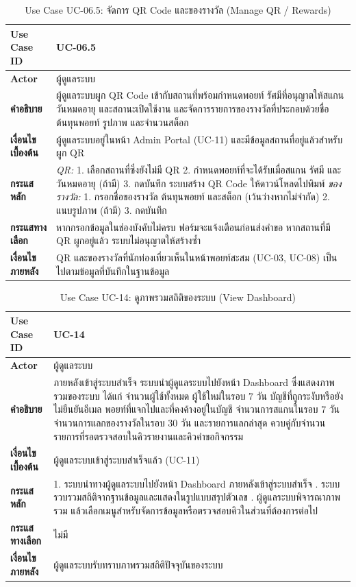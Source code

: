 \begin{table}[H]
\centering
\caption{Use Case UC-06.5: จัดการ QR Code และของรางวัล (Manage QR / Rewards)}
\label{tab:uc06qr}
\begin{tabular}{|p{3.2cm}|p{10cm}|}
\hline
\textbf{Use Case ID} & UC-06.5 \\ \hline
\textbf{Actor} & ผู้ดูแลระบบ \\ \hline
\textbf{คำอธิบาย} & ผู้ดูแลระบบผูก QR Code เข้ากับสถานที่พร้อมกำหนดพอยท์ รัศมีที่อนุญาตให้สแกน วันหมดอายุ และสถานะเปิดใช้งาน และจัดการรายการของรางวัลที่ประกอบด้วยชื่อ ต้นทุนพอยท์ รูปภาพ และจำนวนสต็อก \\ \hline
\textbf{เงื่อนไขเบื้องต้น} & ผู้ดูแลระบบอยู่ในหน้า Admin Portal (UC-11) และมีข้อมูลสถานที่อยู่แล้วสำหรับผูก QR \\ \hline
\textbf{กระแสหลัก} & \textit{QR:} 1. เลือกสถานที่ซึ่งยังไม่มี QR 2. กำหนดพอยท์ที่จะได้รับเมื่อสแกน รัศมี และวันหมดอายุ (ถ้ามี) 3. กดบันทึก ระบบสร้าง QR Code ให้ดาวน์โหลดไปพิมพ์ \newline \textit{ของรางวัล:} 1. กรอกชื่อของรางวัล ต้นทุนพอยท์ และสต็อก (เว้นว่างหากไม่จำกัด) 2. แนบรูปภาพ (ถ้ามี) 3. กดบันทึก \\ \hline
\textbf{กระแสทางเลือก} & หากกรอกข้อมูลในช่องบังคับไม่ครบ ฟอร์มจะแจ้งเตือนก่อนส่งคำขอ หากสถานที่มี QR ผูกอยู่แล้ว ระบบไม่อนุญาตให้สร้างซ้ำ \\ \hline
\textbf{เงื่อนไขภายหลัง} & QR และของรางวัลที่นักท่องเที่ยวเห็นในหน้าพอยท์สะสม (UC-03, UC-08) เป็นไปตามข้อมูลที่บันทึกในฐานข้อมูล \\
\hline
\end{tabular}
\end{table}

\begin{table}[H]
\centering
\caption{Use Case UC-14: ดูภาพรวมสถิติของระบบ (View Dashboard)}
\label{tab:uc14}
\begin{tabular}{|p{3.2cm}|p{10cm}|}
\hline
\textbf{Use Case ID} & UC-14 \\ \hline
\textbf{Actor} & ผู้ดูแลระบบ \\ \hline
\textbf{คำอธิบาย} & ภายหลังเข้าสู่ระบบสำเร็จ ระบบนำผู้ดูแลระบบไปยังหน้า Dashboard ซึ่งแสดงภาพรวมของระบบ ได้แก่ จำนวนผู้ใช้ทั้งหมด ผู้ใช้ใหม่ในรอบ 7 วัน บัญชีที่ถูกระงับหรือยังไม่ยืนยันอีเมล พอยท์ที่แจกไปและที่คงค้างอยู่ในบัญชี จำนวนการสแกนในรอบ 7 วัน จำนวนการแลกของรางวัลในรอบ 30 วัน และรายการแลกล่าสุด ควบคู่กับจำนวนรายการที่รอตรวจสอบในคิวรายงานและคิวคำขอกิจกรรม \\ \hline
\textbf{เงื่อนไขเบื้องต้น} & ผู้ดูแลระบบเข้าสู่ระบบสำเร็จแล้ว (UC-11) \\ \hline
\textbf{กระแสหลัก} & 1. ระบบนำทางผู้ดูแลระบบไปยังหน้า Dashboard ภายหลังเข้าสู่ระบบสำเร็จ \newline 2. ระบบรวบรวมสถิติจากฐานข้อมูลและแสดงในรูปแบบสรุปตัวเลข \newline 3. ผู้ดูแลระบบพิจารณาภาพรวม แล้วเลือกเมนูสำหรับจัดการข้อมูลหรือตรวจสอบคิวในส่วนที่ต้องการต่อไป \\ \hline
\textbf{กระแสทางเลือก} & ไม่มี \\ \hline
\textbf{เงื่อนไขภายหลัง} & ผู้ดูแลระบบรับทราบภาพรวมสถิติปัจจุบันของระบบ \\
\hline
\end{tabular}
\end{table}

